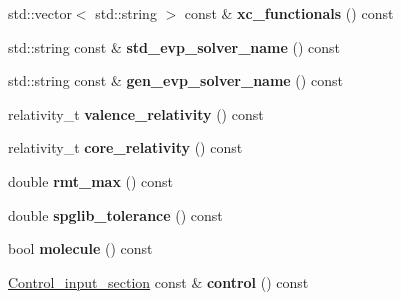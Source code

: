 \begin{DoxyCompactItemize}
\item 
\hypertarget{classsirius_1_1_simulation__parameters_af0b4c060a088734530ef1ef46fe1e0e4}{}std\+::vector$<$ std\+::string $>$ const \& {\bfseries xc\+\_\+functionals} () const \label{classsirius_1_1_simulation__parameters_af0b4c060a088734530ef1ef46fe1e0e4}

\item 
\hypertarget{classsirius_1_1_simulation__parameters_a93feb8aa8a7bef918bb3fa2eacda9723}{}std\+::string const \& {\bfseries std\+\_\+evp\+\_\+solver\+\_\+name} () const \label{classsirius_1_1_simulation__parameters_a93feb8aa8a7bef918bb3fa2eacda9723}

\item 
\hypertarget{classsirius_1_1_simulation__parameters_a2f8b4474ca7965d0b275650f385d4faa}{}std\+::string const \& {\bfseries gen\+\_\+evp\+\_\+solver\+\_\+name} () const \label{classsirius_1_1_simulation__parameters_a2f8b4474ca7965d0b275650f385d4faa}

\item 
\hypertarget{classsirius_1_1_simulation__parameters_a1934a45583657ecd7636fa30d6a90e44}{}relativity\+\_\+t {\bfseries valence\+\_\+relativity} () const \label{classsirius_1_1_simulation__parameters_a1934a45583657ecd7636fa30d6a90e44}

\item 
\hypertarget{classsirius_1_1_simulation__parameters_a8f154f7da2b7a6aa4577acfdb3f53e40}{}relativity\+\_\+t {\bfseries core\+\_\+relativity} () const \label{classsirius_1_1_simulation__parameters_a8f154f7da2b7a6aa4577acfdb3f53e40}

\item 
\hypertarget{classsirius_1_1_simulation__parameters_a58e01e07d069a2d1b1d6c400ceca336c}{}double {\bfseries rmt\+\_\+max} () const \label{classsirius_1_1_simulation__parameters_a58e01e07d069a2d1b1d6c400ceca336c}

\item 
\hypertarget{classsirius_1_1_simulation__parameters_a22e2b0413a678a5df66751c4031b987b}{}double {\bfseries spglib\+\_\+tolerance} () const \label{classsirius_1_1_simulation__parameters_a22e2b0413a678a5df66751c4031b987b}

\item 
\hypertarget{classsirius_1_1_simulation__parameters_aa7948fb58fcc053498f1351ac5d3607c}{}bool {\bfseries molecule} () const \label{classsirius_1_1_simulation__parameters_aa7948fb58fcc053498f1351ac5d3607c}

\item 
\hypertarget{classsirius_1_1_simulation__parameters_a1a5e9277a0ea990d46fd6cc1bb2dd150}{}\hyperlink{structsirius_1_1_control__input__section}{Control\+\_\+input\+\_\+section} const \& {\bfseries control} () const \label{classsirius_1_1_simulation__parameters_a1a5e9277a0ea990d46fd6cc1bb2dd150}


\end{DoxyCompactItemize}
